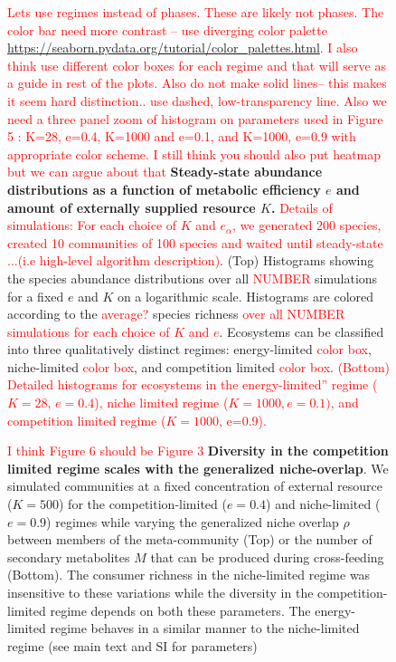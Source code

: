 \documentclass[aps,amsmath,graphix,amssymb,longbibliography]{revtex4-1}
\newcommand\0{\scalebox{-1}[1]{0}}
\newcommand*{\red}{\textcolor{red}}
\begin{document}
\begin{figure}
\caption{ \red{ Lets use regimes instead of phases. These are likely not phases. The color bar need more contrast -- use diverging color palette  \url{https://seaborn.pydata.org/tutorial/color_palettes.html}. I also think use 
different color boxes for each regime and that will serve as a guide in rest of the plots. Also do not make solid lines-- this makes it seem hard distinction.. use dashed, low-transparency line. Also we need a three panel zoom of histogram on parameters used in Figure 5 : K=28, e=0.4, K=1000 and e=0.1, and K=1000, e=0.9 with appropriate color scheme. I still think you should also put heatmap but we can argue about that} {\bf Steady-state abundance distributions as a function of metabolic efficiency $e$ and amount of externally supplied resource $K$. } \red{Details of simulations: For each choice of  $K$ and $e_\alpha$, we generated 200 species, created 10 communities of 100 species and waited until steady-state ...(i.e  high-level algorithm description)}. (Top) Histograms showing the species abundance distributions over all \red{NUMBER} simulations for a fixed $e$ and $K$ on a logarithmic scale. Histograms are colored according to the \red{average?} species richness \red{over all NUMBER simulations for each choice of $K$ and $e$}. Ecosystems can be classified into three qualitatively distinct regimes: energy-limited \red{color box}, niche-limited \red{color box}, and competition limited \red{color box}. \red{ (Bottom) Detailed histograms for ecosystems in the energy-limited'' regime ( $K=28$, $e=0.4$), niche limited regime ($K=1000, e=0.1)$, and competition limited regime ($K=1000$, e=0.9).}}
\end{figure}

\begin{figure}
\caption{ \red{I think Figure 6 should be Figure 3} {\bf Diversity in the competition limited regime scales with the generalized niche-overlap}. We simulated communities at a fixed concentration of external resource ($K=500$) for the competition-limited ($e=0.4$) and niche-limited  ($e=0.9$) regimes while  varying the generalized niche overlap $\rho$ between members of the meta-community (Top) or the number of secondary metabolites $M$ that can be produced during cross-feeding (Bottom).  The consumer richness in the niche-limited regime was insensitive to these variations while the diversity in the competition-limited regime depends on both these parameters. The energy-limited regime behaves in a similar manner to the niche-limited regime (see main text and SI for parameters)}
 \end{figure}
\end{document}
